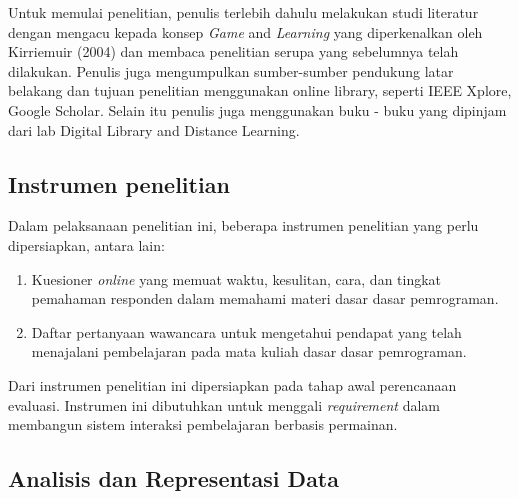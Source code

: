 	Untuk memulai penelitian, penulis terlebih dahulu melakukan studi literatur dengan
	mengacu kepada konsep \textit{Game} and \textit{Learning} yang
	diperkenalkan oleh Kirriemuir (2004) dan membaca penelitian serupa yang sebelumnya telah dilakukan. Penulis juga mengumpulkan sumber-sumber pendukung latar belakang dan tujuan penelitian menggunakan online library, seperti IEEE Xplore, Google Scholar. Selain itu penulis juga menggunakan buku - buku yang dipinjam dari lab Digital Library and Distance Learning.
	
	\subsection{Instrumen penelitian}
	
	Dalam pelaksanaan penelitian ini, beberapa instrumen penelitian yang perlu dipersiapkan, antara lain:
	
	\begin{enumerate}
		\item Kuesioner \textit{online} yang memuat waktu, kesulitan, cara, dan tingkat pemahaman responden dalam memahami materi dasar dasar pemrograman.
		\item Daftar pertanyaan wawancara untuk mengetahui pendapat yang telah menajalani pembelajaran pada mata kuliah dasar dasar pemrograman.
	\end{enumerate}

	Dari instrumen penelitian ini dipersiapkan pada tahap awal perencanaan evaluasi. Instrumen ini dibutuhkan untuk menggali \textit{requirement} dalam membangun sistem interaksi pembelajaran berbasis permainan.
	
	\subsection{Analisis dan Representasi Data}
	
